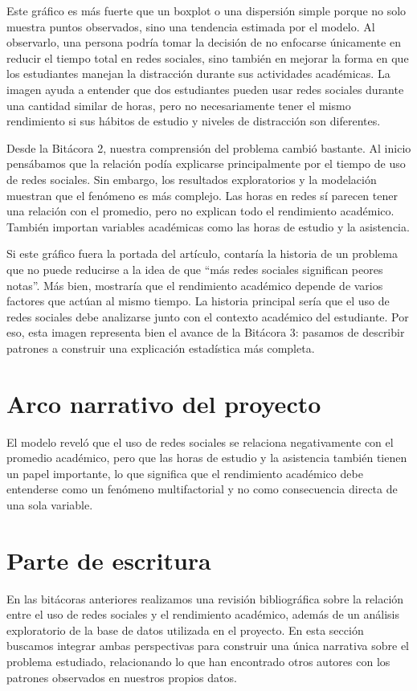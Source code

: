 \documentclass[12pt]{article}
\begin{document}
Este gráfico es más fuerte que un boxplot o una dispersión simple porque no solo muestra puntos observados, sino una tendencia estimada por el modelo. Al observarlo, una persona podría tomar la decisión de no enfocarse únicamente en reducir el tiempo total en redes sociales, sino también en mejorar la forma en que los estudiantes manejan la distracción durante sus actividades académicas. La imagen ayuda a entender que dos estudiantes pueden usar redes sociales durante una cantidad similar de horas, pero no necesariamente tener el mismo rendimiento si sus hábitos de estudio y niveles de distracción son diferentes.

Desde la Bitácora 2, nuestra comprensión del problema cambió bastante. Al inicio pensábamos que la relación podía explicarse principalmente por el tiempo de uso de redes sociales. Sin embargo, los resultados exploratorios y la modelación muestran que el fenómeno es más complejo. Las horas en redes sí parecen tener una relación con el promedio, pero no explican todo el rendimiento académico. También importan variables académicas como las horas de estudio y la asistencia.

Si este gráfico fuera la portada del artículo, contaría la historia de un problema que no puede reducirse a la idea de que ``más redes sociales significan peores notas''. Más bien, mostraría que el rendimiento académico depende de varios factores que actúan al mismo tiempo. La historia principal sería que el uso de redes sociales debe analizarse junto con el contexto académico del estudiante. Por eso, esta imagen representa bien el avance de la Bitácora 3: pasamos de describir patrones a construir una explicación estadística más completa.

\section{Arco narrativo del proyecto}

El modelo reveló que el uso de redes sociales se relaciona negativamente con el promedio académico, pero que las horas de estudio y la asistencia también tienen un papel importante, lo que significa que el rendimiento académico debe entenderse como un fenómeno multifactorial y no como consecuencia directa de una sola variable.

\section{Parte de escritura}
En las bitácoras anteriores realizamos una revisión bibliográfica sobre la relación entre el uso de redes sociales y el rendimiento académico, además de un análisis exploratorio de la base de datos utilizada en el proyecto. En esta sección buscamos integrar ambas perspectivas para construir una única narrativa sobre el problema estudiado, relacionando lo que han encontrado otros autores con los patrones observados en nuestros propios datos.
\end{document}
